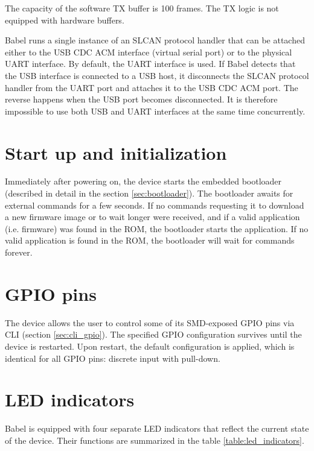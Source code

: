 \documentclass{zubaxdoc}
\begin{document}
The capacity of the software TX buffer is 100 frames.
The TX logic is not equipped with hardware buffers.

Babel runs a single instance of an SLCAN protocol handler that can be attached either to the
USB CDC ACM interface (virtual serial port) or to the physical UART interface.
By default, the UART interface is used.
If Babel detects that the USB interface is connected to a USB host,
it disconnects the SLCAN protocol handler from the UART port and attaches it to the USB CDC ACM port.
The reverse happens when the USB port becomes disconnected.
It is therefore impossible to use both USB and UART interfaces at the same time concurrently.

\section{Start up and initialization}

Immediately after powering on, the device starts the embedded bootloader (described in detail in the section
\ref{sec:bootloader}).
The bootloader awaits for external commands for a few seconds.
If no commands requesting it to download a new firmware image or to wait longer were received,
and if a valid application (i.e. firmware) was found in the ROM,
the bootloader starts the application.
If no valid application is found in the ROM, the bootloader will wait for commands forever.

\section{GPIO pins}\label{sec:principles_gpio}

The device allows the user to control some of its SMD-exposed GPIO pins via CLI (section \ref{sec:cli_gpio}).
The specified GPIO configuration survives until the device is restarted.
Upon restart, the default configuration is applied, which is identical for all GPIO pins:
discrete input with pull-down.

\section{LED indicators}

\newcommand{\LEDX}{{\rule{0.4em}{0.8em}}}
\newcommand{\LEDO}{{\rule{0.4em}{0.1em}}}

\newcommand{\ShowColor}[1]{{\color{#1}\rule{2em}{0.8em}}}

Babel is equipped with four separate LED indicators that reflect the current state of the device.
Their functions are summarized in the table \ref{table:led_indicators}.
\end{document}
